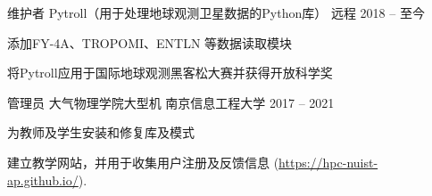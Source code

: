 

\begin{cventries}

  \cventry
    {维护者} %
    {Pytroll（用于处理地球观测卫星数据的Python库）} %
    {远程} %
    {2018 -- 至今} %
    {
      \begin{cvitems} %
        \item {添加FY-4A、TROPOMI、ENTLN 等数据读取模块}
        \item {将Pytroll应用于国际地球观测黑客松大赛并获得开放科学奖}
      \end{cvitems}
    }

  \cventry
    {管理员} %
    {大气物理学院大型机} %
    {南京信息工程大学} %
    {2017 -- 2021} %
    {
      \begin{cvitems} %
        \item {为教师及学生安装和修复库及模式}
        \item {建立教学网站，并用于收集用户注册及反馈信息 (\url{https://hpc-nuist-ap.github.io/}).}
      \end{cvitems}
    }

\end{cventries}

